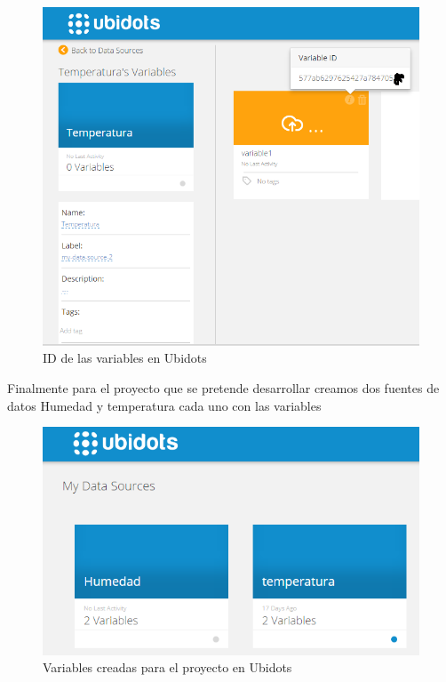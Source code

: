 \documentclass[10pt]{article}\usepackage[]{graphicx}\usepackage[]{color}
\begin{document}
 	\begin{figure}[H]
 		\centering
 		\includegraphics[scale=0.3]{ubi5}   %
 		\caption{ID de las variables en Ubidots} 		
 	\end{figure}
 	
Finalmente para el proyecto que se pretende desarrollar creamos dos fuentes de datos Humedad y temperatura cada uno con las variables
 	\begin{figure}[ht]
 		\centering
 		\includegraphics[scale=0.3]{ubi6}   %
 		\caption{Variables creadas para el proyecto en Ubidots} 		
 	\end{figure}
\end{document}
